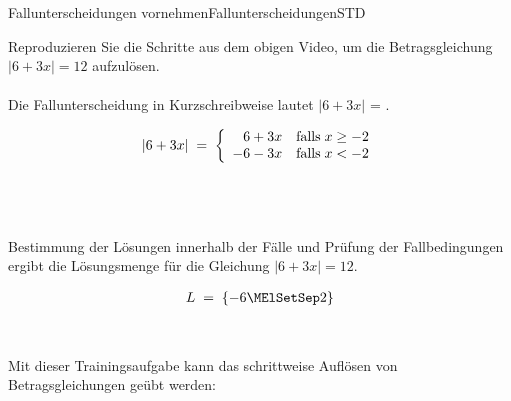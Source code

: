 \begin{MXContent}{Fallunterscheidungen vornehmen}{Fallunterscheidungen}{STD}
\begin{MExercise}
Reproduzieren Sie die Schritte aus dem obigen Video, um die Betragsgleichung
$|6+3x|=12$ aufzulösen. \ \\ \ \\
Die Fallunterscheidung in Kurzschreibweise lautet $|6+3x|$ = .
\begin{MHint}{\iSolution}
\begin{eqnarray*}
|6+3x| \;=\; \left\lbrace{\begin{array}{rl} 6+3x &\text{falls}\;x\geq -2 \\ -6-3x & \text{falls}\;x<-2 \end{array}}\right.
\end{eqnarray*}
\end{MHint}\\
\ \\ \ \\
Bestimmung der Lösungen innerhalb der Fälle und Prüfung der Fallbedingungen ergibt die Lösungsmenge  für die Gleichung $|6+3x|=12$.
\begin{MHint}{\iSolution}
\begin{eqnarray*}
\ML \;=\; \{-6\MElSetSep 2\}
\end{eqnarray*}
\end{MHint}\\
\end{MExercise}

Mit dieser Trainingsaufgabe kann das schrittweise Auflösen von Betragsgleichungen geübt werden:



\end{MXContent}


